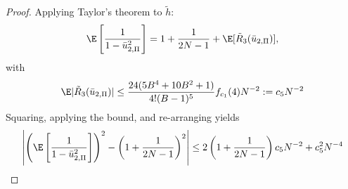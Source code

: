 \begin{proof}
  Applying Taylor's theorem to $\tilde{h}$:
  \begin{equation*}
    \E \left [ \frac{1}{1-\bar{u}_{2,\Pi}^2} \right ]
    = 1 + \frac{1}{2N-1} + \E [\tilde{R}_3(\bar{u}_{2,\Pi})],
  \end{equation*}
  with
  \begin{equation*}
    \E |\tilde{R}_3(\bar{u}_{2,\Pi})| \leq \frac{24(5B^4 + 10B^2 + 1)}{4!(B-1)^5}f_{c_1}(4) N^{-2}
    := c_5 N^{-2}
  \end{equation*}
  Squaring, applying the bound, and re-arranging yields
  \begin{equation*}
    \left | \left ( \E \left [ \frac{1}{1-\bar{u}_{2,\Pi}^2} \right ] \right )^2 
      - \left ( 1 + \frac{1}{2N-1} \right )^2 \right | \leq 
    2 \left ( 1 + \frac{1}{2N-1} \right ) c_5 N^{-2} + c_5^2 N^{-4}
  \end{equation*}
  

\end{proof}
